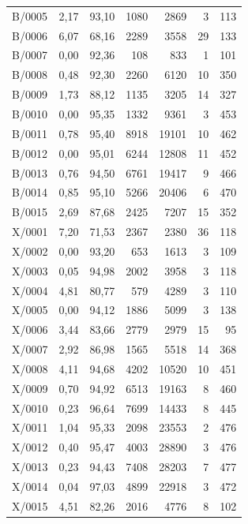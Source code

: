 \begin{longtable}{lrrrrrr}
B/0005 & 2,17 & 93,10 & 1080 & 2869 & 3 & 113 \\
B/0006 & 6,07 & 68,16 & 2289 & 3558 & 29 & 133 \\
B/0007 & 0,00 & 92,36 & 108 & 833 & 1 & 101 \\
B/0008 & 0,48 & 92,30 & 2260 & 6120 & 10 & 350 \\
B/0009 & 1,73 & 88,12 & 1135 & 3205 & 14 & 327 \\
B/0010 & 0,00 & 95,35 & 1332 & 9361 & 3 & 453 \\
B/0011 & 0,78 & 95,40 & 8918 & 19101 & 10 & 462 \\
B/0012 & 0,00 & 95,01 & 6244 & 12808 & 11 & 452 \\
B/0013 & 0,76 & 94,50 & 6761 & 19417 & 9 & 466 \\
B/0014 & 0,85 & 95,10 & 5266 & 20406 & 6 & 470 \\
B/0015 & 2,69 & 87,68 & 2425 & 7207 & 15 & 352 \\
X/0001 & 7,20 & 71,53 & 2367 & 2380 & 36 & 118 \\
X/0002 & 0,00 & 93,20 & 653 & 1613 & 3 & 109 \\
X/0003 & 0,05 & 94,98 & 2002 & 3958 & 3 & 118 \\
X/0004 & 4,81 & 80,77 & 579 & 4289 & 3 & 110 \\
X/0005 & 0,00 & 94,12 & 1886 & 5099 & 3 & 138 \\
X/0006 & 3,44 & 83,66 & 2779 & 2979 & 15 & 95 \\
X/0007 & 2,92 & 86,98 & 1565 & 5518 & 14 & 368 \\
X/0008 & 4,11 & 94,68 & 4202 & 10520 & 10 & 451 \\
X/0009 & 0,70 & 94,92 & 6513 & 19163 & 8 & 460 \\
X/0010 & 0,23 & 96,64 & 7699 & 14433 & 8 & 445 \\
X/0011 & 1,04 & 95,33 & 2098 & 23553 & 2 & 476 \\
X/0012 & 0,40 & 95,47 & 4003 & 28890 & 3 & 476 \\
X/0013 & 0,23 & 94,43 & 7408 & 28203 & 7 & 477 \\
X/0014 & 0,04 & 97,03 & 4899 & 22918 & 3 & 472 \\
X/0015 & 4,51 & 82,26 & 2016 & 4776 & 8 & 102 \\
\end{longtable}

